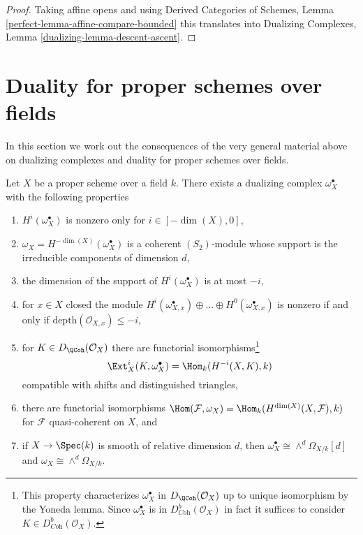 \begin{proof}
Taking affine opens and using
Derived Categories of Schemes, Lemma \ref{perfect-lemma-affine-compare-bounded}
this translates into
Dualizing Complexes, Lemma \ref{dualizing-lemma-descent-ascent}.
\end{proof}







\section{Duality for proper schemes over fields}
\label{section-duality-proper-over-field}

\noindent
In this section we work out the consequences of the very general
material above on dualizing complexes and duality for proper schemes
over fields.

\begin{lemma}
\label{lemma-duality-proper-over-field}
Let $X$ be a proper scheme over a field $k$. There exists a dualizing complex
$\omega_X^\bullet$ with the following properties
\begin{enumerate}
\item $H^i(\omega_X^\bullet)$ is nonzero only for $i \in [-\dim(X), 0]$,
\item $\omega_X = H^{-\dim(X)}(\omega_X^\bullet)$ is a coherent
$(S_2)$-module whose support is the irreducible components of dimension $d$,
\item the dimension of the support of $H^i(\omega_X^\bullet)$ is at most $-i$,
\item for $x \in X$ closed the module
$H^i(\omega_{X, x}^\bullet) \oplus \ldots \oplus H^0(\omega_{X, x}^\bullet)$
is nonzero if and only if $\text{depth}(\mathcal{O}_{X, x}) \leq -i$,
\item for $K \in D_\QCoh(\mathcal{O}_X)$ there are functorial
isomorphisms\footnote{This property
characterizes $\omega_X^\bullet$ in $D_\QCoh(\mathcal{O}_X)$
up to unique isomorphism by the Yoneda lemma. Since $\omega_X^\bullet$
is in $D^b_{\textit{Coh}}(\mathcal{O}_X)$ in fact it suffices to consider
$K \in D^b_{\textit{Coh}}(\mathcal{O}_X)$.}
$$
\Ext^i_X(K, \omega_X^\bullet) = \Hom_k(H^{-i}(X, K), k)
$$
compatible with shifts and distinguished triangles,
\item there are functorial isomorphisms
$\Hom(\mathcal{F}, \omega_X) = \Hom_k(H^{\dim(X)}(X, \mathcal{F}), k)$
for $\mathcal{F}$ quasi-coherent on $X$, and
\item if $X \to \Spec(k)$ is smooth of relative dimension $d$,
then $\omega_X^\bullet \cong \wedge^d\Omega_{X/k}[d]$ and
$\omega_X \cong \wedge^d\Omega_{X/k}$.
\end{enumerate}
\end{lemma}

